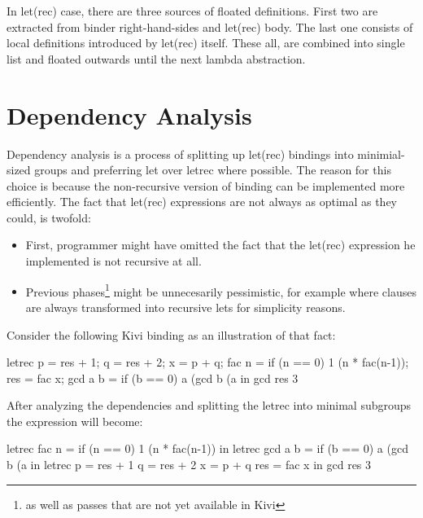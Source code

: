 \documentclass[12pt,a4paper]{report}
\begin{document}
In let(rec) case, there are three sources of floated definitions. First two are
extracted from binder right-hand-sides and let(rec) body. The last one consists
of local definitions introduced by let(rec) itself. These all, are combined into
single list and floated outwards until the next lambda abstraction.

\section{Dependency Analysis}
Dependency analysis is a process of splitting up let(rec) bindings
into minimial-sized groups and preferring let over letrec
where possible. The reason for this choice is because the non-recursive version
of binding can be implemented more efficiently. The fact that let(rec)
expressions are not always as optimal as they could, is twofold:
\begin{itemize}
  \item First, programmer might have omitted the fact that the
    let(rec) expression he implemented is not recursive at all.
  \item Previous phases\footnote{as well as passes that are not yet available
    in Kivi} might be unnecesarily pessimistic, for example where
    clauses are always transformed into recursive lets for simplicity
    reasons.
\end{itemize}
Consider the following Kivi binding as an illustration of that fact:

\vspace*{0.2in}
\begin{code}[style=haskell,label=lst:letrec_dependency_example,caption={Example of
  letrec before dependency analysis.}]
letrec
    p       = res + 1;
    q       = res + 2;
    x       = p + q;
    fac n   = if (n == 0) 1 (n * fac(n-1));
    res     = fac x;
    gcd a b = if (b == 0) a (gcd b (a %
in
    gcd res 3
\end{code}

After analyzing the dependencies and splitting the letrec into minimal
subgroups the expression will become:

\vspace*{0.2in}
\begin{code}[style=haskell,label=lst:letrec_after_anlysis,caption={letrec
  after performing dependency anlysis.}]
letrec
    fac n = if (n == 0) 1 (n * fac(n-1))
in letrec
    gcd a b = if (b == 0) a (gcd b (a %
in letrec
    p = res + 1
    q = res + 2
    x = p + q
    res = fac x
in
    gcd res 3
\end{code}
\end{document}
